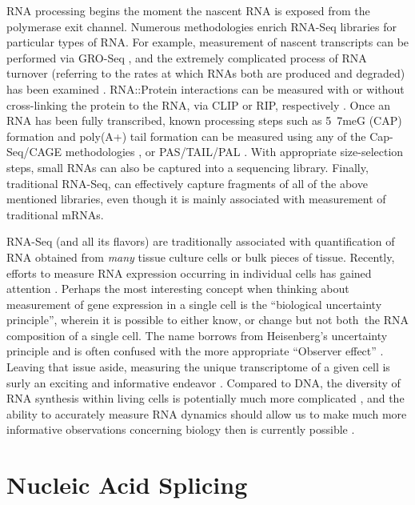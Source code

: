     RNA processing begins the moment the nascent RNA is exposed from the polymerase exit channel. Numerous methodologies enrich RNA-Seq libraries for particular types of RNA. For example, measurement of nascent transcripts can be performed via GRO-Seq \citep{Core2008a}, and the extremely complicated process of RNA turnover (referring to the rates at which RNAs both are produced and degraded) has been examined \citep{Ghosh2010a, Tani2012}. RNA::Protein interactions can be measured with or without cross-linking the protein to the RNA, via CLIP or RIP, respectively \citep{Ule2005,Licatalosi200,Singh2013}. Once an RNA has been fully transcribed, known processing steps such as 5\textprime~7meG (CAP) formation and poly(A+) tail formation can be measured using any of the Cap-Seq/CAGE methodologies \citep{Shiraki2003a}, or PAS/TAIL/PAL \citep{Shepard2011, Chang2014b, Subtelny2014}. With appropriate size-selection steps, small RNAs \citep{Ghildiyal2008} can also be captured into a sequencing library. Finally, traditional RNA-Seq, can effectively capture fragments of all of the above mentioned libraries, even though it is mainly associated with measurement of traditional mRNAs.

    RNA-Seq (and all its flavors) are traditionally associated with quantification of RNA obtained from \textit{many} tissue culture cells or bulk pieces of tissue. Recently, efforts to measure RNA expression occurring in individual cells has gained attention \citep{Shapiro2013b}. Perhaps the most interesting concept when thinking about measurement of gene expression in a single cell is the ``biological uncertainty principle'', wherein it is possible to either know, or change \textemdash but not both\textemdash~the RNA composition of a single cell. The name borrows from Heisenberg's uncertainty principle \citep{Kennard1927} and is often confused with the more appropriate ``Observer effect'' \citep{Riley2013}. Leaving that issue aside, measuring the unique transcriptome of a given cell is surly an exciting and informative endeavor \citep{Marinov2013, Shalek2013b,Wills2013}. Compared to DNA, the diversity of RNA synthesis within living cells is potentially much more complicated \citep{Shendure2012}, and the ability to accurately measure RNA dynamics should allow us to make much more informative observations concerning biology then is currently possible \citep{Djebali2012}.

\section{Nucleic Acid Splicing}\label{Intro:sec:Nucleic Acid Splicing}

